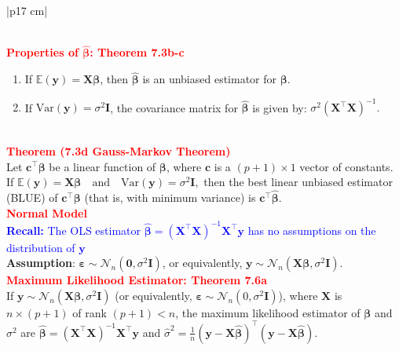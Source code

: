 \documentclass[a4paper,11pt]{article}
\begin{document}
\begin{longtable}{|p{17 cm}|}
\begin{minipage}{\linewidth}
{\begin{enumerate}[noitemsep, topsep=0pt, partopsep=0pt, parsep=0pt]
\end{enumerate}}
\end{minipage} \\
\hline
\newpage
\hline
\textcolor{red}{\textbf{Properties of $\mathbf{\hat{\beta}}$: Theorem 7.3b-c}}\\
\begin{minipage}{\linewidth} 
\vspace{-0.15cm}
\begin{enumerate}[noitemsep, topsep=0pt]
    \item If $\mathbb{E}(\mathbf{y}) = \mathbf{X} \mathbf{\beta}$, then $\boldsymbol{\hat{\beta}}$ is an unbiased estimator for $\mathbf{\beta}$.
    \item If $\text{Var}(\mathbf{y}) = \sigma^2 \mathbf{I}$, the covariance matrix for $\boldsymbol{\hat{\beta}}$ is given by:
    $\sigma^2 \left( \mathbf{X}^{\top} \mathbf{X} \right)^{-1}.$
\end{enumerate}
\end{minipage} \\
\hline  
\textcolor{red}{\textbf{Theorem (7.3d Gauss-Markov Theorem)}} \\
Let $\mathbf{c}^{\top} \boldsymbol{\beta}$ be a linear function of $\boldsymbol{\beta}$, where $\mathbf{c}$ is a $(p+1) \times 1$ vector of constants. If
$\mathbb{E}(\mathbf{y}) = \mathbf{X} \boldsymbol{\beta} \quad \text{and} \quad \text{Var}(\mathbf{y}) = \sigma^2 \mathbf{I},$
then the best linear unbiased estimator (BLUE) of $\mathbf{c}^{\top} \boldsymbol{\beta}$ (that is, with minimum variance) is $\mathbf{c}^{\top} \boldsymbol{\hat{\beta}}$.\\
\hline
\textcolor{red}{\textbf{Normal Model}} \\
\textcolor{blue}{\textbf{Recall:} The OLS estimator $\boldsymbol{\hat{\beta}} = \left( \mathbf{X}^{\top} \mathbf{X} \right)^{-1} \mathbf{X}^{\top} \mathbf{y}$ has no assumptions on the distribution of $\mathbf{y}$} \\
\textbf{Assumption}: $\boldsymbol{\varepsilon} \sim \mathcal{N}_n(\mathbf{0}, \sigma^2 \mathbf{I})$, or equivalently, $\mathbf{y} \sim \mathcal{N}_n (\mathbf{X} \boldsymbol{\beta}, \sigma^2 \mathbf{I})$. \\
\hline
\textcolor{red}{\textbf{Maximum Likelihood Estimator: Theorem 7.6a}} \\
If $\mathbf{y} \sim \mathcal{N}_n(\mathbf{X} \boldsymbol{\beta}, \sigma^2 \mathbf{I})$ (or equivalently, $\boldsymbol{\varepsilon} \sim \mathcal{N}_n(0, \sigma^2 \mathbf{I})$), where $\mathbf{X}$ is $n \times (p+1)$ of rank $(p+1) < n$, the maximum likelihood estimator of $\boldsymbol{\beta}$ and $\sigma^2$ are $\boldsymbol{\hat{\beta}} = \left( \mathbf{X}^{\top} \mathbf{X} \right)^{-1} \mathbf{X}^{\top} \mathbf{y}$ and $\hat{\sigma}^2 = \frac{1}{n} (\mathbf{y} - \mathbf{X} \boldsymbol{\hat{\beta}})^{\top} (\mathbf{y} - \mathbf{X} \boldsymbol{\hat{\beta}})$. \\

\end{longtable}
\end{document}
